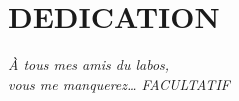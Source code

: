 \chapter*{DEDICATION}\thispagestyle{headings}
\begin{flushright}
  \itshape
  À tous mes amis du labos,\\
  vous me manquerez\ldots
  FACULTATIF
\end{flushright}
